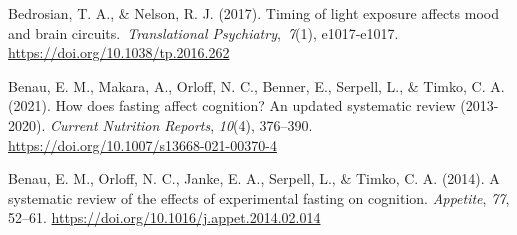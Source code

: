 \documentclass[authordate, empirical,issue]{jote-new-article}
\begin{document}












Bedrosian, T. A., \& Nelson, R. J. (2017). Timing of light exposure affects mood and brain circuits. \emph{Translational Psychiatry}, \emph{7}(1), e1017-e1017. \url{https://doi.org/10.1038/tp.2016.262}






Benau, E. M., Makara, A., Orloff, N. C., Benner, E., Serpell, L., \& Timko, C. A. (2021). How does fasting affect cognition? An updated systematic review (2013-2020). \emph{Current Nutrition Reports}, \emph{10}(4), 376--390. \href{https://doi.org/10.1007/s13668-021-00370-4}{https://doi.org/10.1007/s13668-021-00370-4}



Benau, E. M., Orloff, N. C., Janke, E. A., Serpell, L., \& Timko, C. A. (2014). A systematic review of the effects of experimental fasting on cognition. \emph{Appetite}, \emph{77}, 52--61. \href{https://doi.org/10.1016/j.appet.2014.02.014}{https://doi.org/10.1016/j.appet.2014.02.014}
\end{document}
